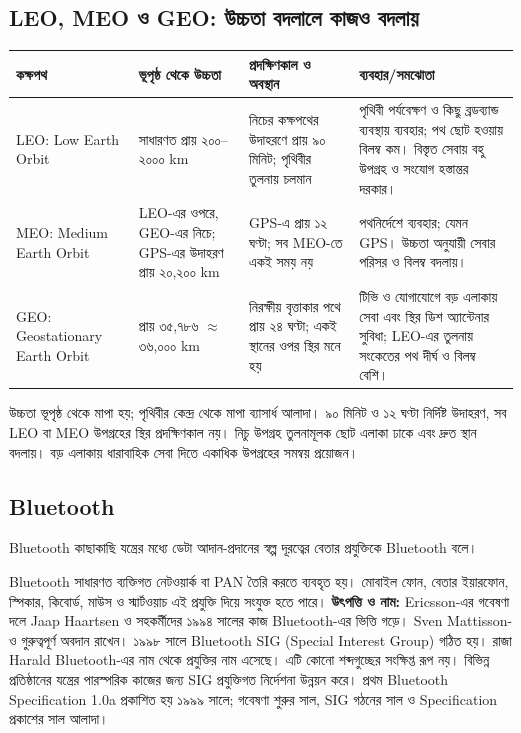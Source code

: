 \subsection{LEO, MEO ও GEO: উচ্চতা বদলালে কাজও বদলায়}
\begin{tabularx}{\linewidth}{|p{.15\linewidth}|p{.27\linewidth}|X|X|}\hline
\textbf{কক্ষপথ} & \textbf{ভূপৃষ্ঠ থেকে উচ্চতা} & \textbf{প্রদক্ষিণকাল ও অবস্থান} & \textbf{ব্যবহার/সমঝোতা}\\\hline
LEO: Low Earth Orbit & সাধারণত প্রায় ২০০--২০০০ km & নিচের কক্ষপথের উদাহরণে প্রায় ৯০ মিনিট; পৃথিবীর তুলনায় চলমান & পৃথিবী পর্যবেক্ষণ ও কিছু ব্রডব্যান্ড ব্যবস্থায় ব্যবহার; পথ ছোট হওয়ায় বিলম্ব কম। বিস্তৃত সেবায় বহু উপগ্রহ ও সংযোগ হস্তান্তর দরকার।\\\hline
MEO: Medium Earth Orbit & LEO-এর ওপরে, GEO-এর নিচে; GPS-এর উদাহরণ প্রায় ২০,২০০ km & GPS-এ প্রায় ১২ ঘণ্টা; সব MEO-তে একই সময় নয় & পথনির্দেশে ব্যবহার; যেমন GPS। উচ্চতা অনুযায়ী সেবার পরিসর ও বিলম্ব বদলায়।\\\hline
GEO: Geostationary Earth Orbit & প্রায় ৩৫,৭৮৬ $\approx$ ৩৬,০০০ km & নিরক্ষীয় বৃত্তাকার পথে প্রায় ২৪ ঘণ্টা; একই স্থানের ওপর স্থির মনে হয় & টিভি ও যোগাযোগে বড় এলাকায় সেবা এবং স্থির ডিশ অ্যান্টেনার সুবিধা; LEO-এর তুলনায় সংকেতের পথ দীর্ঘ ও বিলম্ব বেশি।\\\hline
\end{tabularx}
উচ্চতা ভূপৃষ্ঠ থেকে মাপা হয়; পৃথিবীর কেন্দ্র থেকে মাপা ব্যাসার্ধ আলাদা। ৯০ মিনিট ও ১২ ঘণ্টা নির্দিষ্ট উদাহরণ, সব LEO বা MEO উপগ্রহের স্থির প্রদক্ষিণকাল নয়। নিচু উপগ্রহ তুলনামূলক ছোট এলাকা ঢাকে এবং দ্রুত স্থান বদলায়। বড় এলাকায় ধারাবাহিক সেবা দিতে একাধিক উপগ্রহের সমন্বয় প্রয়োজন।
\subsection{Bluetooth}
\label{ch2:bluetooth-numeric}

\begin{definitionbox}{Bluetooth}
কাছাকাছি যন্ত্রের মধ্যে ডেটা আদান-প্রদানের স্বল্প দূরত্বের বেতার প্রযুক্তিকে Bluetooth বলে।
\end{definitionbox}

Bluetooth সাধারণত ব্যক্তিগত নেটওয়ার্ক বা PAN তৈরি করতে ব্যবহৃত হয়। মোবাইল ফোন, বেতার ইয়ারফোন, স্পিকার, কিবোর্ড, মাউস ও স্মার্টওয়াচ এই প্রযুক্তি দিয়ে সংযুক্ত হতে পারে।
\textbf{উৎপত্তি ও নাম:} Ericsson-এর গবেষণা দলে Jaap Haartsen ও সহকর্মীদের ১৯৯৪ সালের কাজ Bluetooth-এর ভিত্তি গড়ে। Sven Mattisson-ও গুরুত্বপূর্ণ অবদান রাখেন। ১৯৯৮ সালে Bluetooth SIG (Special Interest Group) গঠিত হয়। রাজা Harald Bluetooth-এর নাম থেকে প্রযুক্তির নাম এসেছে। এটি কোনো শব্দগুচ্ছের সংক্ষিপ্ত রূপ নয়। বিভিন্ন প্রতিষ্ঠানের যন্ত্রের পারস্পরিক কাজের জন্য SIG প্রযুক্তিগত নির্দেশনা উন্নয়ন করে।
প্রথম Bluetooth Specification 1.0a প্রকাশিত হয় ১৯৯৯ সালে; গবেষণা শুরুর সাল, SIG গঠনের সাল ও Specification প্রকাশের সাল আলাদা।

